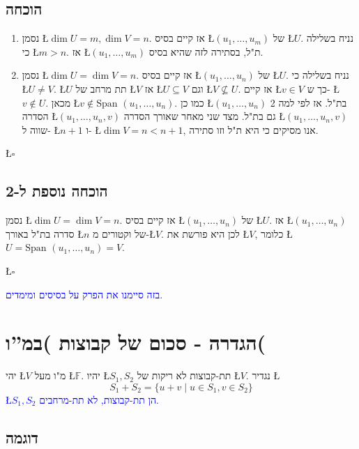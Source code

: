 \documentclass[english,hebrew]{article}
\newcommand{\spn}{\text{Span }}
\begin{document}
\subsection{הוכחה}
\begin{enumerate}
\item נסמן \L{$\dim U=m,\dim V=n$}. אז קיים בסיס \L{$(u_{1},\dots,u_{m})$}
של \L{$U$}. נניח בשלילה כי \L{$m>n$}. אז \L{$(u_{1},\dots,u_{m})$}
ת"ל, בסתירה לזה שהיא בסיס. 
\item נסמן \L{$\dim U=\dim V=n$}. אז קיים בסיס \L{$(u_{1},\dots,u_{n})$}
של \L{$U$}. נניח בשלילה כי \L{$U\neq V$}. \L{$U$} תת מרחב של \L{$V$}
אז \L{$U\subseteq V$} וגם \L{$V\not\subseteq U$}. אז קיים \L{$v\in V$}
כך ש- \L{$v\notin U$}. מכאן \L{$v\notin\spn(u_{1},\dots,u_{n})$}.
כמו כן \L{$(u_{1},\dots,u_{n})$} בת"ל. אז לפי למה 2 הסדרה \L{$(u_{1},\dots,u_{n},v)$}
גם בת"ל. מצד שני מאחר שאורך הסדרה \L{$(u_{1},\dots,u_{n},v)$} שווה
ל- \L{$n+1$} ו- \L{$\dim V=n<n+1$}, אנו מסיקים כי היא ת"ל וזו סתירה.
\end{enumerate}
\begin{flushright}
\L{$\square$}
\par\end{flushright}

\subsection{הוכחה נוספת ל-2}

נסמן \L{$\dim U=\dim V=n$}. אז קיים בסיס \L{$(u_{1},\dots,u_{n})$}
של \L{$U$}. אז \L{$(u_{1},\dots,u_{n})$} סדרה בת"ל באורך \L{$n$}
של וקטורים מ-\L{$V$}. לכן היא פורשת את \L{$V$}, כלומר \L{$U=\spn(u_{1},\dots,u_{n})=V$}. 
\begin{flushright}
\L{$\square$}\\
\par\end{flushright}

\textcolor{blue}{בזה סיימנו את הפרק על בסיסים ומימדים.}

\section{הגדרה - סכום של קבוצות )במ\textquotedblright ו(}

יהי \L{$V$} מ"ו מעל \L{$\mathbb{F}$}. יהיו \L{$S_{1},S_{2}$} תת-קבוצות
לא ריקות של \L{$V$}. נגדיר \L{%
\[
S_{1}+S_{2}=\{u+v\mid u\in S_{1},v\in S_{2}\}
\]
}%
\textcolor{blue}{\L{$S_{1},S_{2}$} הן תת-קבוצות, לא תת-מרחבים.}

\subsection{דוגמה}
\end{document}
